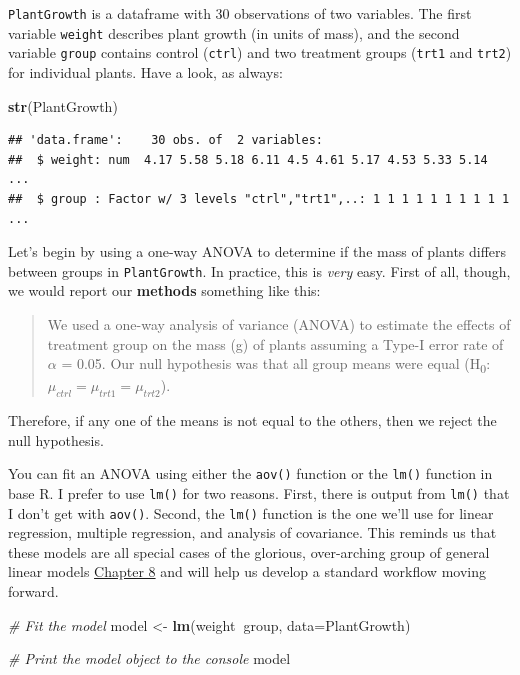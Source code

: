 \documentclass[
]{book}
\newenvironment{Shaded}{\begin{snugshade}}{\end{snugshade}}
\newcommand{\CommentTok}[1]{\textcolor[rgb]{0.56,0.35,0.01}{\textit{#1}}}
\newcommand{\DataTypeTok}[1]{\textcolor[rgb]{0.13,0.29,0.53}{#1}}
\newcommand{\KeywordTok}[1]{\textcolor[rgb]{0.13,0.29,0.53}{\textbf{#1}}}
\newcommand{\NormalTok}[1]{#1}
\newcommand{\OperatorTok}[1]{\textcolor[rgb]{0.81,0.36,0.00}{\textbf{#1}}}
\newcommand{\StringTok}[1]{\textcolor[rgb]{0.31,0.60,0.02}{#1}}
\begin{document}
\texttt{PlantGrowth} is a dataframe with 30 observations of two variables. The first variable \texttt{weight} describes plant growth (in units of mass), and the second variable \texttt{group} contains control (\texttt{ctrl}) and two treatment groups (\texttt{trt1} and \texttt{trt2}) for individual plants. Have a look, as always:

\begin{Shaded}
\begin{Highlighting}[]
\KeywordTok{str}\NormalTok{(PlantGrowth)}
\end{Highlighting}
\end{Shaded}

\begin{verbatim}
## 'data.frame':	30 obs. of  2 variables:
##  $ weight: num  4.17 5.58 5.18 6.11 4.5 4.61 5.17 4.53 5.33 5.14 ...
##  $ group : Factor w/ 3 levels "ctrl","trt1",..: 1 1 1 1 1 1 1 1 1 1 ...
\end{verbatim}

Let's begin by using a one-way ANOVA to determine if the mass of plants differs between groups in \texttt{PlantGrowth}. In practice, this is \emph{very} easy. First of all, though, we would report our \textbf{methods} something like this:

\begin{quote}
We used a one-way analysis of variance (ANOVA) to estimate the effects of treatment group on the mass (g) of plants assuming a Type-I error rate of \(\alpha\) = 0.05. Our null hypothesis was that all group means were equal (H\textsubscript{0}: \(\mu_{ctrl} = \mu_{trt1} = \mu_{trt2}\)).
\end{quote}

Therefore, if any one of the means is not equal to the others, then we reject the null hypothesis.

You can fit an ANOVA using either the \texttt{aov()} function or the \texttt{lm()} function in base R. I prefer to use \texttt{lm()} for two reasons. First, there is output from \texttt{lm()} that I don't get with \texttt{aov()}. Second, the \texttt{lm()} function is the one we'll use for linear regression, multiple regression, and analysis of covariance. This reminds us that these models are all special cases of the glorious, over-arching group of general linear models \protect\hyperlink{Chapter8}{Chapter 8} and will help us develop a standard workflow moving forward.

\begin{Shaded}
\begin{Highlighting}[]
\CommentTok{# Fit the model}
\NormalTok{model <-}\StringTok{ }\KeywordTok{lm}\NormalTok{(weight}\OperatorTok{~}\NormalTok{group, }\DataTypeTok{data=}\NormalTok{PlantGrowth)}

\CommentTok{# Print the model object to the console}
\NormalTok{model}
\end{Highlighting}
\end{Shaded}
\end{document}
